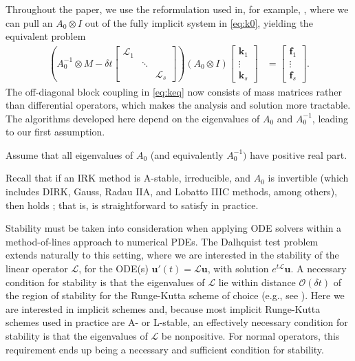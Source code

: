 \documentclass[review]{siamart}
\begin{document}
Throughout the paper, we use the reformulation used in, for example,
\cite{pazner17}, where we can pull an $A_0\otimes I$ out of the
fully implicit system in \eqref{eq:k0}, yielding the equivalent problem
%
\begin{align}\label{eq:keq}
\left( A_0^{-1}\otimes M - \delta t \begin{bmatrix} \mathcal{L}_1  & \\ & \ddots \\ && \mathcal{L}_s\end{bmatrix}\right)
	(A_0\otimes I)	\begin{bmatrix} \mathbf{k}_1 \\ \vdots \\ \mathbf{k}_s \end{bmatrix}
& = \begin{bmatrix} \mathbf{f}_1 \\ \vdots \\ \mathbf{f}_s \end{bmatrix}.
\end{align}
%
The off-diagonal block coupling in \eqref{eq:keq} now consists of mass matrices
rather than differential operators, which makes the analysis and solution more
tractable.
The algorithms developed here depend on the eigenvalues of $A_0$ and
$A_0^{-1}$, leading to our first assumption.
%
\begin{assumption} \label{ass:eig}
Assume that all eigenvalues of $A_0$ (and equivalently $A_0^{-1})$ have positive real part.
\end{assumption}
%
Recall that if an IRK method is A-stable, irreducible, and $A_0$ is invertible
(which includes DIRK, Gauss, Radau IIA, and Lobatto IIIC methods, among others),
then  holds \cite{hairer96}; that is,  is
straightforward to satisfy in practice.

Stability must be taken into consideration when applying ODE solvers within a
method-of-lines approach to numerical PDEs. The Dalhquist test problem extends
naturally to this setting, where we are interested in the stability of the
linear operator $\mathcal{L}$, for the ODE(s)
$\mathbf{u}'(t) = \mathcal{L}\mathbf{u}$, with solution $e^{t\mathcal{L}}\mathbf{u}$.
A necessary condition for stability is that the eigenvalues of $\mathcal{L}$
lie within distance $\mathcal{O}(\delta t)$ of the region of stability for
the Runge-Kutta scheme of choice (e.g., see \cite{reddy92}). Here we are
interested in implicit schemes and, because most implicit Runge-Kutta schemes
used in practice are A- or L-stable, an effectively necessary condition for
stability is that the eigenvalues of $\mathcal{L}$ be nonpositive. For
normal operators, this requirement ends up being a necessary and sufficient
condition for stability.
\end{document}
